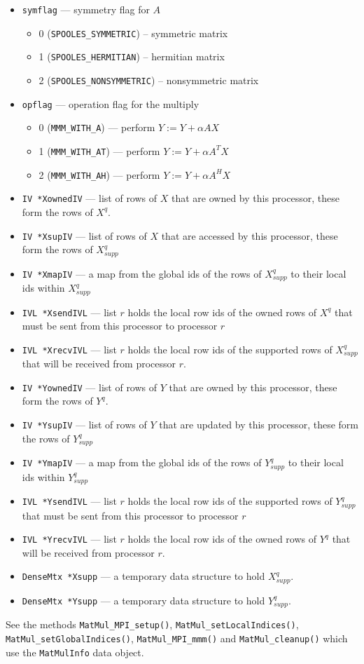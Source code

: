 \begin{itemize}
\item
{\tt symflag} --- symmetry flag for $A$
\begin{itemize}
\item 0 ({\tt SPOOLES\_SYMMETRIC}) -- symmetric matrix
\item 1 ({\tt SPOOLES\_HERMITIAN}) -- hermitian matrix
\item 2 ({\tt SPOOLES\_NONSYMMETRIC}) -- nonsymmetric matrix
\end{itemize}
\item
{\tt opflag} --- operation flag for the multiply
\begin{itemize}
\item 0 ({\tt MMM\_WITH\_A})  --- perform $Y := Y + \alpha A X$
\item 1 ({\tt MMM\_WITH\_AT}) --- perform $Y := Y + \alpha A^T X$
\item 2 ({\tt MMM\_WITH\_AH}) --- perform $Y := Y + \alpha A^H X$
\end{itemize}
\item
{\tt IV *XownedIV}  ---
list of rows of $X$ that are owned by this processor,
these form the rows of $X^q$.
\item
{\tt IV *XsupIV}  ---
list of rows of $X$ that are accessed by this processor,
these form the rows of $X_{supp}^q$
\item
{\tt IV *XmapIV}  ---
a map from the global ids of the rows of $X_{supp}^q$
to their local ids within $X_{supp}^q$
\item
{\tt IVL *XsendIVL} ---
list $r$ holds the local row ids of the owned rows of $X^q$ that must
be sent from this processor to processor $r$
\item
{\tt IVL *XrecvIVL} ---
list $r$ holds the local row ids of the supported rows of $X_{supp}^q$ 
that will be received from processor $r$.
\item
{\tt IV *YownedIV}  ---
list of rows of $Y$ that are owned by this processor,
these form the rows of $Y^q$.
\item
{\tt IV *YsupIV}  ---
list of rows of $Y$ that are updated by this processor,
these form the rows of $Y_{supp}^q$
\item
{\tt IV *YmapIV}  ---
a map from the global ids of the rows of $Y_{supp}^q$
to their local ids within $Y_{supp}^q$
\item
{\tt IVL *YsendIVL} ---
list $r$ holds the local row ids of the supported rows of $Y_{supp}^q$ 
that must be sent from this processor to processor $r$
\item
{\tt IVL *YrecvIVL} ---
list $r$ holds the local row ids of the owned rows of $Y^q$
that will be received from processor $r$.
\item
{\tt DenseMtx *Xsupp} ---
a temporary data structure to hold $X_{supp}^q$.
\item
{\tt DenseMtx *Ysupp} ---
a temporary data structure to hold $Y_{supp}^q$.
\end{itemize}
\par
See the methods 
{\tt MatMul\_MPI\_setup()},
{\tt MatMul\_setLocalIndices()},
{\tt MatMul\_setGlobalIndices()},
{\tt MatMul\_MPI\_mmm()} and
{\tt MatMul\_cleanup()}
which use the {\tt MatMulInfo} data object.

